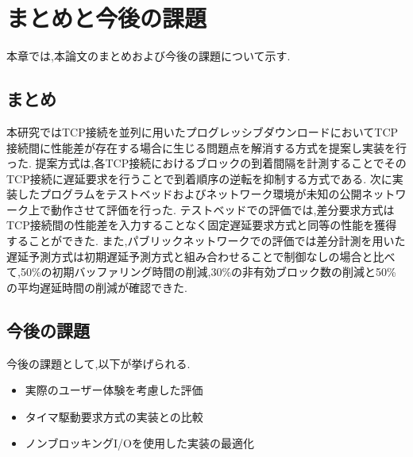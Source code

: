 \documentclass[a4j,12pt]{gradthesis_utf8}
\begin{document}
\newpage
 
\chapter{まとめと今後の課題}\label{matomekongo}
本章では,本論文のまとめおよび今後の課題について示す.
\section{まとめ}
本研究ではTCP接続を並列に用いたプログレッシブダウンロードにおいてTCP接続間に性能差が存在する場合に生じる問題点を解消する方式を提案し実装を行った.
提案方式は,各TCP接続におけるブロックの到着間隔を計測することでそのTCP接続に遅延要求を行うことで到着順序の逆転を抑制する方式である.
次に実装したプログラムをテストベッドおよびネットワーク環境が未知の公開ネットワーク上で動作させて評価を行った.
テストベッドでの評価では,差分要求方式はTCP接続間の性能差を入力することなく固定遅延要求方式と同等の性能を獲得することができた.
また,パブリックネットワークでの評価では差分計測を用いた遅延予測方式は初期遅延予測方式と組み合わせることで制御なしの場合と比べて,50\%の初期バッファリング時間の削減,30\%の非有効ブロック数の削減と50\%の平均遅延時間の削減が確認できた.


\section{今後の課題}
\hspace*{0.5em}今後の課題として,以下が挙げられる.
\begin{itemize}
    \item 実際のユーザー体験を考慮した評価
    \item タイマ駆動要求方式の実装との比較
    \item ノンブロッキングI/Oを使用した実装の最適化
\end{itemize}
\end{document}
